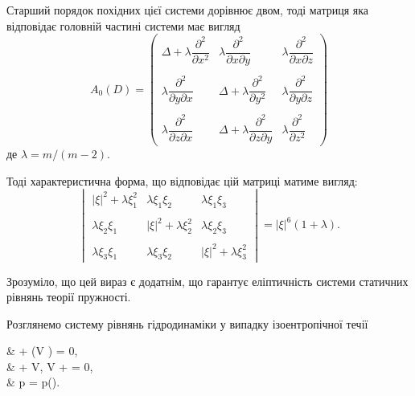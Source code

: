 \begin{solution}
	Старший порядок похідних цієї системи дорівнює двом, тоді матриця яка відповідає головній частині системи має вигляд
	\begin{equation}
		A_0(D) = \begin{pmatrix}
			\Delta + \lambda \dfrac{\partial^2}{\partial x^2} & \lambda \dfrac{\partial^2}{\partial x\partial y} & \lambda \dfrac{\partial^2}{\partial x\partial z} \\
			\\
			\lambda \dfrac{\partial^2}{\partial y\partial x} & \Delta + \lambda \dfrac{\partial^2}{\partial y^2} & \lambda \dfrac{\partial^2}{\partial y\partial z} \\
			\\
			\lambda \dfrac{\partial^2}{\partial z\partial x} & \Delta + \lambda \dfrac{\partial^2}{\partial z \partial y} & \lambda \dfrac{\partial^2}{\partial z^2}
		\end{pmatrix}
	\end{equation}
	де $\lambda = m / (m - 2)$. \medskip

	Тоді характеристична форма, що відповідає цій матриці матиме вигляд:
	\begin{equation}
		\begin{vmatrix}
			|\xi|^2 + \lambda \xi_1^2 & \lambda \xi_1 \xi_2 & \lambda \xi_1 \xi_3 \\
			\\
			\lambda \xi_2 \xi_1 & |\xi|^2 + \lambda \xi_2^2 & \lambda \xi_2 \xi_3 \\
			\\
			\lambda \xi_3 \xi_1 & \lambda \xi_3 \xi_2 & |\xi|^2 + \lambda \xi_3^2
		\end{vmatrix} = |\xi|^6 (1 + \lambda).
	\end{equation}

	Зрозуміло, що цей вираз є додатнім, що гарантує еліптичність системи статичних рівнянь теорії пружності.
\end{solution}

\begin{example}
	Розглянемо систему рівнянь гідродинаміки у випадку ізоентропічної течії 
	\begin{system}
		&  + \nabla \cdot \Big(\rho \vecf V \Big) = 0, \\
		&  + \langle \vecf V, \nabla \rangle \vecf V +  = 0, \\
		& p = p(\rho).
	\end{system}
\end{example}
 
